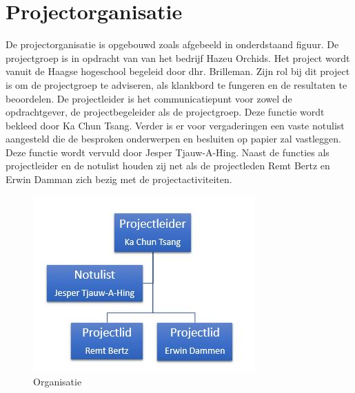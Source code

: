\section{Projectorganisatie}

De projectorganisatie is opgebouwd zoals afgebeeld in onderdstaand figuur. De projectgroep is in opdracht van van het bedrijf Hazeu Orchids.
Het project wordt vanuit de Haagse hogeschool begeleid door dhr. Brilleman. Zijn rol bij
dit project is om de projectgroep te adviseren, als klankbord te fungeren en de resultaten
te beoordelen. De projectleider is het communicatiepunt voor zowel de opdrachtgever, de
projectbegeleider als de projectgroep. Deze functie wordt bekleed door Ka Chun Tsang.
Verder is er voor vergaderingen een vaste notulist aangesteld die de besproken onderwerpen
en besluiten op papier zal vastleggen. Deze functie wordt vervuld door Jesper Tjauw-A-Hing.
Naast de functies als projectleider en de notulist houden zij net als de projectleden Remt Bertz en Erwin Damman zich bezig met de projectactiviteiten.

\begin{figure}[h]
	\centering
	\includegraphics[width=\textwidth]{Afbeeldingen/Organisatie.JPG}
	\caption{Organisatie} 
\end{figure}


\newpage